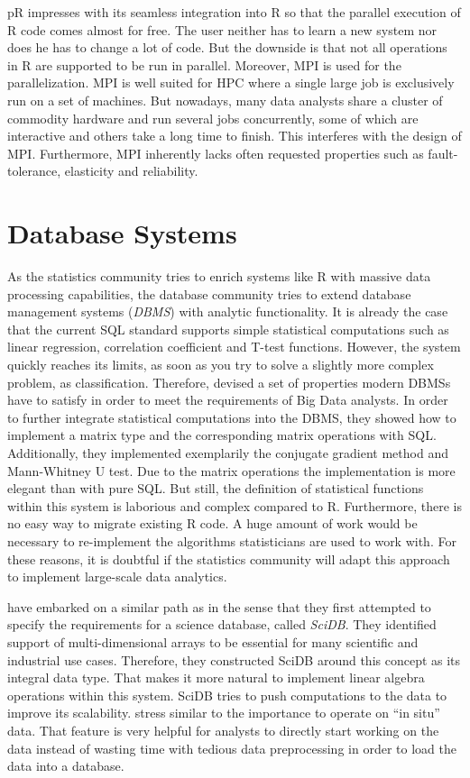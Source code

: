 pR impresses with its seamless integration into R so that the parallel execution of R code comes almost for free.
The user neither has to learn a new system nor does he has to change a lot of code.
But the downside is that not all operations in R are supported to be run in parallel.
Moreover, MPI is used for the parallelization.
MPI is well suited for HPC where a single large job is exclusively run on a set of machines.
But nowadays, many data analysts share a cluster of commodity hardware and run several jobs concurrently, some of which are interactive and others take a long time to finish.
This interferes with the design of MPI.
Furthermore, MPI inherently lacks often requested properties such as fault-tolerance, elasticity and reliability.

\section{Database Systems}

As the statistics community tries to enrich systems like R with massive data processing capabilities, the database community tries to extend database management systems (\emph{DBMS}) with analytic functionality.
It is already the case that the current SQL standard supports simple statistical computations such as linear regression, correlation coefficient and T-test functions.
However, the system quickly reaches its limits, as soon as you try to solve a slightly more complex problem, as classification.
Therefore, \textcite{cohen:pve2009a} devised a set of properties modern DBMSs have to satisfy in order to meet the requirements of Big Data analysts.
In order to further integrate statistical computations into the DBMS, they showed how to implement a matrix type and the corresponding matrix operations with SQL.
Additionally, they implemented exemplarily the conjugate gradient method and Mann-Whitney U test.
Due to the matrix operations the implementation is more elegant than with pure SQL.
But still, the definition of statistical functions within this system is laborious and complex compared to R.
Furthermore, there is no easy way to migrate existing R code.
A huge amount of work would be necessary to re-implement the algorithms statisticians are used to work with.
For these reasons, it is doubtful if the statistics community will adapt this approach to implement large-scale data analytics.

\Textcite{stonebraker:2009a} have embarked on a similar path as \citeauthor{cohen:pve2009a} in the sense that they first attempted to specify the requirements for a science database, called \emph{SciDB}.
They identified support of multi-dimensional arrays to be essential for many scientific and industrial use cases.
Therefore, they constructed SciDB around this concept as its integral data type.
That makes it more natural to implement linear algebra operations within this system.
SciDB tries to push computations to the data to improve its scalability.
\citeauthor{stonebraker:2009a} stress similar to \citeauthor{cohen:pve2009a} the importance to operate on ``in situ'' data.
That feature is very helpful for analysts to directly start working on the data instead of wasting time with tedious data preprocessing in order to load the data into a database.

